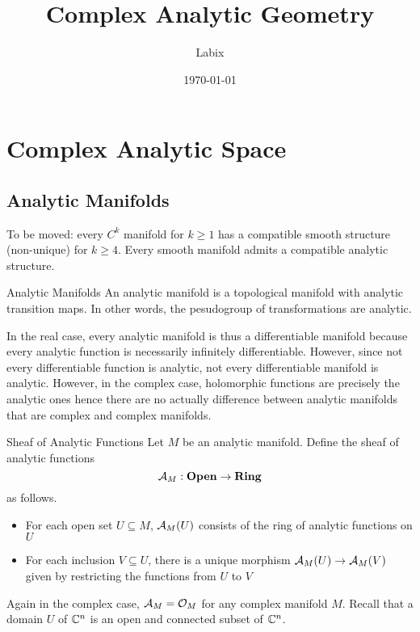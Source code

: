\documentclass[a4paper]{article}
\title{Complex Analytic Geometry}
\author{Labix}
\date{\today}
\begin{document}
\maketitle
\begin{abstract}
\end{abstract}
\pagebreak
\tableofcontents

\pagebreak
\section{Complex Analytic Space}
\subsection{Analytic Manifolds}
To be moved: every $C^k$ manifold for $k\geq 1$ has a compatible smooth structure (non-unique) for $k\geq 4$. Every smooth manifold admits a compatible analytic structure. 

\begin{defn}{Analytic Manifolds}{} An analytic manifold is a topological manifold with analytic transition maps. In other words, the pesudogroup of transformations are analytic. 
\end{defn}

In the real case, every analytic manifold is thus a differentiable manifold because every analytic function is necessarily infinitely differentiable. However, since not every differentiable function is analytic, not every differentiable manifold is analytic. However, in the complex case, holomorphic functions are precisely the analytic ones hence there are no actually difference between analytic manifolds that are complex and complex manifolds. 

\begin{defn}{Sheaf of Analytic Functions}{} Let $M$ be an analytic manifold. Define the sheaf of analytic functions $$\mathcal{A}_M:\bold{Open}\to\bold{Ring}$$ as follows. 
\begin{itemize}
\item For each open set $U\subseteq M$, $\mathcal{A}_M(U)$ consists of the ring of analytic functions on $U$
\item For each inclusion $V\subseteq U$, there is a unique morphism $\mathcal{A}_M(U)\to\mathcal{A}_M(V)$ given by restricting the functions from $U$ to $V$
\end{itemize}
\end{defn}

Again in the complex case, $\mathcal{A}_M=\mathcal{O}_M$ for any complex manifold $M$. Recall that a domain $U$ of $\mathbb{C}^n$ is an open and connected subset of $\mathbb{C}^n$. 
\end{document}
